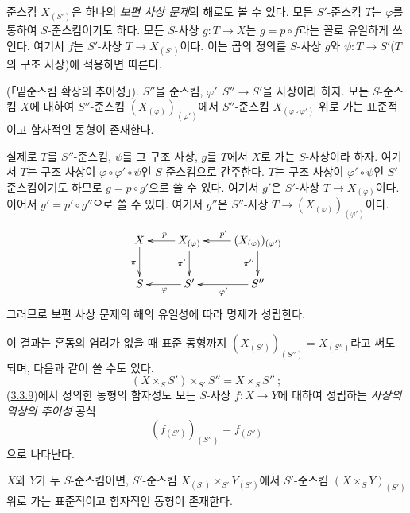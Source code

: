 \begin{env}[3.3.8]
\label{I.3.3.8-ko}
준스킴 $X_{(S')}$은 하나의 \emph{보편 사상 문제}의 해로도 볼 수
있다. 모든 $S'$-준스킴 $T$는 $\varphi$를 통하여 $S$-준스킴이기도
하다. 모든 $S$-사상 $g:T\to X$는 $g=p\circ f$라는 꼴로 유일하게
쓰인다. 여기서 $f$는 $S'$-사상 $T\to X_{(S')}$이다. 이는 곱의
정의를 $S$-사상 $g$와 $\psi:T\to S'$($T$의 구조 사상)에 적용하면
따른다.
\end{env}

\begin{proposition}[3.3.9]
\label{I.3.3.9-ko}
\textup{(「밑준스킴 확장의 추이성」).} $S''$을 준스킴,
$\varphi':S''\to S'$을 사상이라 하자. 모든 $S$-준스킴 $X$에
대하여 $S''$-준스킴 $(X_{(\varphi)})_{(\varphi')}$에서
$S''$-준스킴 $X_{(\varphi\circ\varphi')}$ 위로 가는 표준적이고
함자적인 동형이 존재한다.
\end{proposition}

실제로 $T$를 $S''$-준스킴, $\psi$를 그 구조 사상, $g$를 $T$에서
$X$로 가는 $S$-사상이라 하자. 여기서 $T$는 구조 사상이
$\varphi\circ\varphi'\circ\psi$인 $S$-준스킴으로 간주한다.
$T$는 구조 사상이 $\varphi'\circ\psi$인 $S'$-준스킴이기도 하므로
$g=p\circ g'$으로 쓸 수 있다. 여기서 $g'$은
$S'$-사상 $T\to X_{(\varphi)}$이다. 이어서
$g'=p'\circ g''$으로 쓸 수 있다. 여기서 $g''$은
$S''$-사상 $T\to(X_{(\varphi)})_{(\varphi')}$이다.
\label{I.3.3.9.transitivity-diagram-ko}
\[
  \xymatrix{
    X\ar[d]_{\pi} &
    X_{(\varphi)}\ar[l]_{p}\ar[d]_{\pi'} &
    (X_{(\varphi)})_{(\varphi')}\ar[l]_{p'}\ar[d]_{\pi''}\\
    S & S'\ar[l]^{\varphi} & S''\ar[l]^{\varphi'}
  }
\]
그러므로 보편 사상 문제의 해의 유일성에 따라 명제가 성립한다.

이 결과는 혼동의 염려가 없을 때 표준 동형까지
$(X_{(S')})_{(S'')}=X_{(S'')}$라고 써도 되며, 다음과 같이 쓸
수도 있다.
\begin{equation}
  (X\times_S S')\times_{S'}S''=X\times_S S''~;
  \tag{3.3.9.1}\label{I.3.3.9.1-ko}
\end{equation}
(\hyperref[I.3.3.9-ko]{3.3.9})에서 정의한 동형의 함자성도 모든
$S$-사상 $f:X\to Y$에 대하여 성립하는
\emph{사상의 역상의 추이성} 공식
\begin{equation}
  (f_{(S')})_{(S'')}=f_{(S'')}
  \tag{3.3.9.2}\label{I.3.3.9.2-ko}
\end{equation}
으로 나타난다.

\begin{corollary}[3.3.10]
\label{I.3.3.10-ko}
$X$와 $Y$가 두 $S$-준스킴이면, $S'$-준스킴
$X_{(S')}\times_{S'}Y_{(S')}$에서 $S'$-준스킴
$(X\times_S Y)_{(S')}$ 위로 가는 표준적이고 함자적인 동형이
존재한다.
\end{corollary}

